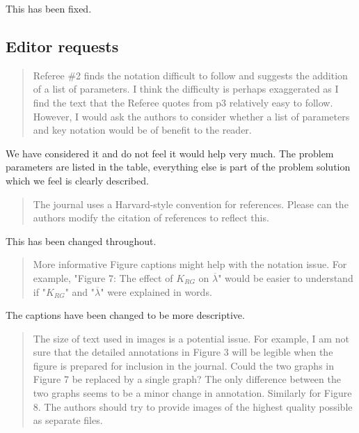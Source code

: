 \documentclass{article}
\begin{document}
This has been fixed.

\subsection{Editor requests}

\begin{quote}
    \begin{textit}{
Referee \#2 finds the notation difficult to follow and suggests the addition of a list of parameters. I think the difficulty is perhaps exaggerated as I find the text that the Referee quotes from p3 relatively easy to follow. However, I would ask the authors to consider whether a list of parameters and key notation would be of benefit to the reader.
    }\end{textit}
\end{quote}

We have considered it and do not feel it would help very much. The problem
parameters are listed in the table, everything else is part of the problem
solution which we feel is clearly described.

\begin{quote}
    \begin{textit}{
        The journal uses a Harvard-style convention for references. Please can the authors modify the citation of references to reflect this.
    }\end{textit}
\end{quote}

This has been changed throughout.

\begin{quote}
    \begin{textit}{
        More informative Figure captions might help with the notation issue. For
        example, "Figure 7: The effect of \(K_{RG}\) on \(\overline{\lambda}\)" would be easier
        to understand if "\(K_{RG}\)" and "\(\overline{\lambda}\)" were explained in words.
    }\end{textit}
\end{quote}

The captions have been changed to be more descriptive.

\begin{quote}
    \begin{textit}{
        The size of text used in images is a potential issue. For example, I am not
        sure that the detailed annotations in Figure 3 will be legible when the figure
        is prepared for inclusion in the journal. Could the two graphs in Figure 7 be
        replaced by a single graph? The only difference between the two graphs seems to
        be a minor change in annotation. Similarly for Figure 8. The authors should try
        to provide images of the highest quality possible as separate files.
    }\end{textit}
\end{quote}
\end{document}
